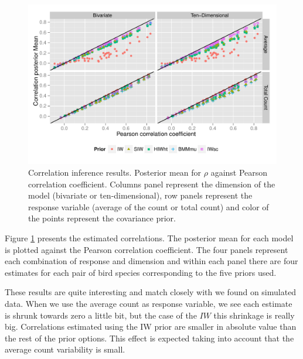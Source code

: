 \documentclass[a4paper]{article}
\newcommand{\matt}[1]{\textcolor{red}{(matt: #1)}}
\begin{document}
\begin{figure}[hbpt]
\centering
\includegraphics[width=\textwidth]{rescorr}
 \vspace{-.5in}
\caption{Correlation inference results. Posterior mean for $\rho$  against Pearson correlation coefficient. 
Columns panel represent the dimension of the model (bivariate or ten-dimensional), row panels represent the response variable (average of the count or total count)  and color of the points represent the covariance prior. \label{fig:coring}  %
}
\end{figure}
%

Figure \ref{fig:coring} presents the estimated correlations. The posterior mean for each model is plotted against the Pearson correlation coefficient. The four panels represent each combination of response and dimension and within each panel there are four estimates for each pair of bird species corresponding to the five priors used. 

These results are quite interesting and match closely with we found on simulated data. When we use the average count as response variable, we see each estimate is shrunk towards zero a little bit, but the case of the $IW$ this shrinkage is really big. Correlations estimated using the IW prior are smaller in absolute value than the rest of the prior options. This effect is expected taking into account that the average count variability is small. 
\end{document}
